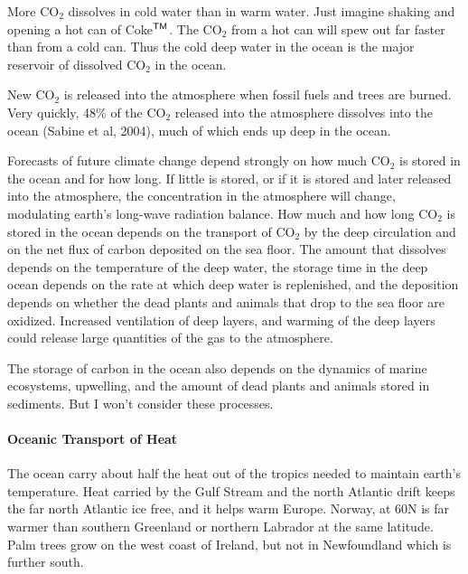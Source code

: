 More CO$_2$ dissolves in cold water than in warm water. Just imagine shaking and
opening a hot can of Coke$^{\mbox{\textsf{\scriptsize TM}}}$. The CO$_2$ from a
hot can will spew out far faster than from a cold can. Thus the cold deep water
in the ocean is the major reservoir of dissolved CO$_2$ in the ocean.

New CO$_ 2$ is released into the atmosphere when fossil fuels and trees are burned. Very quickly, 48\% of the CO$_2$ released into the atmosphere dissolves into the ocean (Sabine et al, 2004), much of which ends up deep in the ocean.

Forecasts of future climate change depend strongly on how much CO$_2$ is stored
in the ocean and for how long. If little is stored, or if it is stored and later
released into the atmosphere, the concentration in the atmosphere will change,
modulating earth's long-wave radiation balance. How much and how long CO$_2$ is
stored in the ocean depends on the transport of CO$_2$ by the
deep circulation and on the net flux of carbon deposited on the sea floor. The amount that
dissolves depends on the temperature of the deep water, the storage time in the deep ocean
depends on the rate at which deep water is replenished, and the deposition depends on
whether the dead plants and animals that drop to the sea floor are  oxidized.
Increased ventilation of deep layers, and warming of the deep layers could
release large quantities of the gas to the atmosphere.

The storage of carbon in the ocean also depends on the dynamics of marine ecosystems, upwelling, and the amount of dead plants and animals stored in sediments. But I won't consider these processes.

\paragraph{Oceanic Transport of Heat}
The ocean carry about half the heat
out of the tropics needed to maintain earth's temperature. Heat carried by
the Gulf Stream and the north Atlantic drift keeps the
far north Atlantic ice free, and it helps warm Europe. Norway, at 60\degrees N is far warmer
than southern Greenland or northern Labrador at the same latitude. Palm trees grow on the west
coast of Ireland, but not in Newfoundland which is further south.


